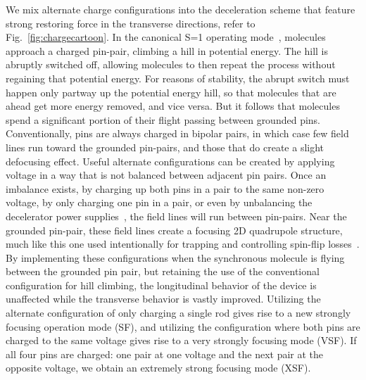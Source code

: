 \documentclass[%
 reprint,
 amsmath,amssymb,
 aps,
prl,
]{revtex4-1}
\begin{document}
We mix alternate charge configurations into the deceleration scheme that feature strong restoring force in the transverse directions, refer to Fig.~\ref{fig:chargecartoon}.
In the canonical S=1 operating mode~\cite{VanDeMeerakker2012}, molecules approach a charged pin-pair, climbing a hill in potential energy. 
The hill is abruptly switched off, allowing molecules to then repeat the process without regaining that potential energy.
For reasons of stability, the abrupt switch must happen only partway up the potential energy hill, so that molecules that are ahead get more energy removed, and vice versa. 
But it follows that molecules spend a significant portion of their flight passing between grounded pins.
Conventionally, pins are always charged in bipolar pairs, in which case few field lines run toward the grounded pin-pairs, and those that do create a slight defocusing effect. 
Useful alternate configurations can be created by applying voltage in a way that is not balanced between adjacent pin pairs. 
Once an imbalance exists, by charging up both pins in a pair to the same non-zero voltage, by only charging one pin in a pair, or even by unbalancing the decelerator power supplies~\cite{Hoekstra2018}, the field lines will run between pin-pairs. 
Near the grounded pin-pair, these field lines create a focusing 2D quadrupole structure, much like this one used intentionally for trapping and controlling spin-flip losses~\cite{Reens2017}. 
By implementing these configurations when the synchronous molecule is flying between the grounded pin pair, but retaining the use of the conventional configuration for hill climbing, the longitudinal behavior of the device is unaffected while the transverse behavior is vastly improved.
Utilizing the alternate configuration of only charging a single rod gives rise to a new strongly focusing operation mode (SF), and utilizing the configuration where both pins are charged to the same voltage gives rise to a very strongly focusing mode (VSF). 
If all four pins are charged: one pair at one voltage and the next pair at the opposite voltage, we obtain an extremely strong focusing mode (XSF).
\end{document}
